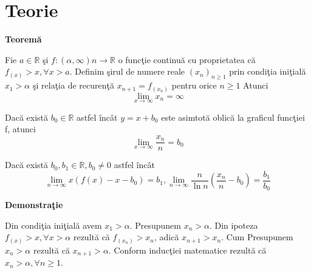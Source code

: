 \documentclass[a4paper,12pt,oneside]{report}
\begin{document}
\section{Teorie}

\textbf{Teorem\u a}

 Fie \(a\in \mathbb{R}\) \c si \(f: \left ( \alpha ,\infty  \right )n \to \mathbb{R}\) o func\c tie continu\u a cu proprietatea c\u a \(f_{(x)}> x, \forall x > a\). Definim \c sirul de numere reale \(\left ( x_{n} \right )_{n\geq 1}\) prin condi\c tia ini\c tial\u a \(x_{1}> \alpha\) \c si rela\c tia de recuren\c t\u a \(x_{n+1} = f_{\left ( x_{n} \right )}\) pentru orice  \(n\geq 1	\)
Atunci 
\begin{displaymath}
  \lim_{x \to \infty }x_{n} = \infty
\end{displaymath}

Dac\u a exist\u a \(b_{0}\in \mathbb{R}\) astfel \^ inc\^ at \(y = x + b_{0}\) este asimtot\u a oblic\u a la graficul func\c tiei f, atunci
\begin{displaymath}
  \lim_{x \to \infty }\frac{x_{n}}{n}=b_{0}
\end{displaymath}

Dac\u a exist\u a \(b_{0}, b_{1}\in \mathbb{R}, b_{0 }\neq 0\) astfel \^ inc\^ at 
\begin{displaymath}
  \lim_{n \to \infty }x\left ( f\left ( x \right )-x-b_{0} \right )= b_{1},
\lim_{n \to \infty } \frac{n}{\ln n}\left ( \frac{x_{n}}{n} -b_{0}\right )=\frac{b_{1}}{b_{0}}
\end{displaymath}


\textbf{Demonstra\c tie}

Din condi\c tia ini\c tial\u a avem \(x_{1}> \alpha\). Presupunem \(x_{n}> \alpha\).
Din ipoteza \(f_{\left ( x \right )}> x, \forall  x> \alpha\) rezult\u a c\u a \(f_{\left ( x _{n}\right )}> x_{n}\), adic\u a \(x_{n+1}> x_{n}\). Cum Presupunem \(x_{n}> \alpha\) rezult\u a c\u a \(x_{n+1}> \alpha\). Conform induc\c tiei matematice rezult\u a c\u a \(x_{n}> \alpha,  \forall n\geq 1\). 
\end{document}

